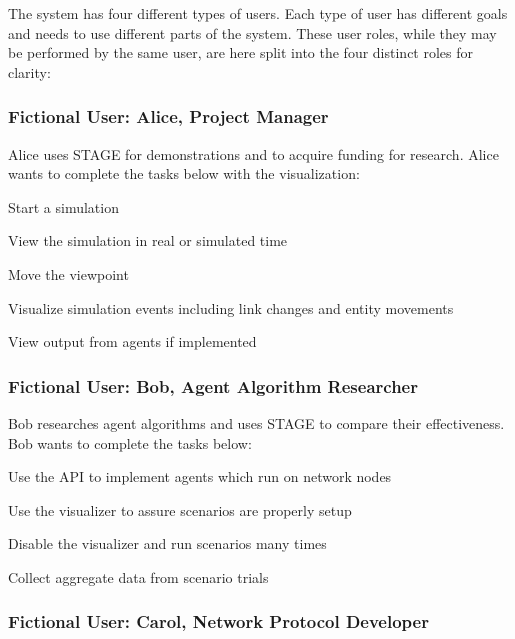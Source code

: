 \documentclass[titlepage]{article}
\begin{document}
The system has four different types of users.  Each type of user has different goals and needs to use different parts of the system.  These user roles, while they may be performed by the same user, are here split into the four distinct roles for clarity:


\subsubsection{Fictional User: Alice, Project Manager%
  \label{alice}%
}

Alice uses STAGE for demonstrations and to acquire funding for research.  Alice wants to complete the tasks below with
the visualization:

\begin{itemize*}
    \item Start a simulation
    \item View the simulation in real or simulated time
    \item Move the viewpoint
    \item Visualize simulation events including link changes and entity movements
    \item View output from agents if implemented
\end{itemize*}

\subsubsection{Fictional User: Bob, Agent Algorithm Researcher%
  \label{bob}%
}

Bob researches agent algorithms and uses STAGE to compare their effectiveness.  Bob wants to complete the tasks below:

\begin{itemize*}
    \item Use the API to implement agents which run on network nodes
    \item Use the visualizer to assure scenarios are properly setup
    \item Disable the visualizer and run scenarios many times
    \item Collect aggregate data from scenario trials
\end{itemize*}

\subsubsection{Fictional User: Carol, Network Protocol Developer%
  \label{bob}%
}
\end{document}

